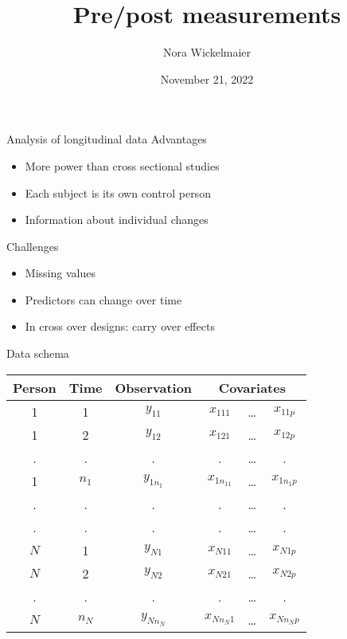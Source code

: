 \documentclass[aspectratio=169]{beamer}
\title{Pre/post measurements}
\author{Nora Wickelmaier}
\date{November 21, 2022}
\begin{document}
\begin{frame}{}
\thispagestyle{empty}
\titlepage
\end{frame}

\begin{frame}{Analysis of longitudinal data}
Advantages

\begin{itemize}
\item More power than cross sectional studies
\item Each subject is its own control person
\item Information about individual changes
\end{itemize}

Challenges
\begin{itemize}
\item Missing values
\item Predictors can change over time
\item In cross over designs: carry over effects
\end{itemize}
\end{frame}

\begin{frame}{Data schema}
\vfill
\begin{center}
\begin{tabular}{cccccc}
\hline
Person & Time      & Observation & \multicolumn{3}{c}{Covariates}\\\hline
1      & 1         & $y_{11}$    & $x_{111}$   & \dots & $x_{11p}$  \\
1      & 2         & $y_{12}$    & $x_{121}$   & \dots & $x_{12p}$  \\
.      & .         & .           & .           & \dots & .          \\
1      & $n_1$     & $y_{1n_1}$  & $x_{1n_11}$ & \dots & $x_{1n_1p}$\\
.      & .         & .           & .           & \dots & .          \\
.      & .         & .           & .           & \dots & .          \\
$N$    & 1         & $y_{N1}$    & $x_{N11}$   & \dots & $x_{N1p}$  \\
$N$    & 2         & $y_{N2}$    & $x_{N21}$   & \dots & $x_{N2p}$  \\
.      & .         & .           & .           & \dots & .          \\
$N$    & $n_N$     & $y_{Nn_N}$  & $x_{Nn_N1}$ & \dots & $x_{Nn_Np}$\\
\hline
\end{tabular}
\end{center}
\vfill
\end{frame}
\end{document}
